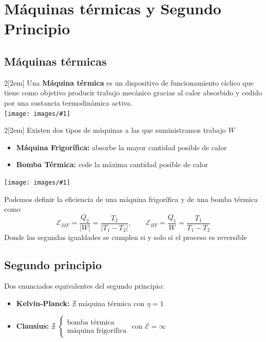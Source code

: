 \documentclass[leqno]{article}
\newcommand{\incimg}[1]{%
    \texttt{[image: images/\#1]}
}
\begin{document}
\section{Máquinas térmicas y Segundo Principio}
\subsection{Máquinas térmicas}
\begin{multicols}{2}[\columnsep2em]
Una \textbf{Máquina térmica} es un dispositivo de funcionamiento cíclico que tiene como objetivo producir trabajo mecánico gracias al calor absorbido y cedido por una sustancia termodinámica activa. \\
\columnbreak
\incimg{MaquinaTermica.png}
\end{multicols}
\begin{multicols}{2}[\columnsep2em]
  Existen dos tipos de máquinas a las que suministramos trabajo $W$
\begin{itemize}
  \item \textbf{Máquina Frigorífica:} absorbe la mayor cantidad posible de calor
  \item \textbf{Bomba Térmica:} cede la máxima cantidad posible de calor 
\end{itemize}
\columnbreak
\incimg{MaquinaFrigorifica.png}
\end{multicols}
Podemos definir la eficiencia de una máquina frigorífica y de una bomba térmica como
\[
\mathcal{E}_{MF} = \frac{Q_2}{|W|} = \frac{T_2}{|T_1- T_2|}, \qquad \mathcal{E}_{BT} = \frac{Q_1}{W} = \frac{T_1}{T_1- T_2}
\]
Donde las segundas igualdades se cumplen si y solo si el proceso es reversible

\subsection{Segundo principio}
Dos enunciados equivalentes del segundo principio:
\begin{itemize}
    \item \textbf{Kelvin-Planck:} $\nexists$ máquina térmica con $\eta = 1$
    \item \textbf{Clausius:} $\nexists$ $\begin{cases}
    \text{bomba térmica} \\
    \text{máquina frigorífica}
    \end{cases}$ con $\mathcal{E}= \infty$
\end{itemize}
\end{document}
